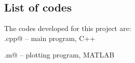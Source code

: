 \documentclass{article}
\begin{document}
\begin{multicols}{2}
\section{List of codes}

The codes developed for this project are:\\

\noindent \verb@main.cpp@ -- main program, C++

\noindent \verb@plotting.m@ -- plotting program, MATLAB

\end{multicols}
\end{document}
